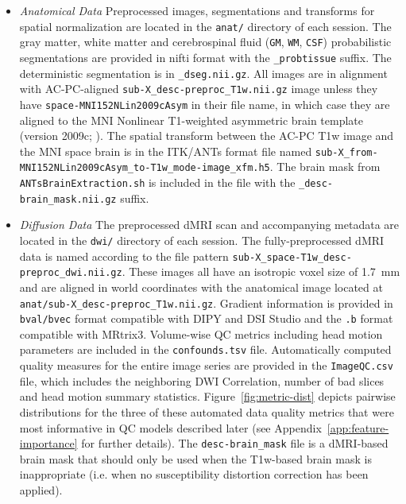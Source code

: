 \documentclass[fleqn,10pt,inline]{wlscirep}
\begin{document}
\begin{itemize}
    \item \emph{Anatomical Data} Preprocessed images, segmentations and transforms for spatial normalization are located in the \texttt{anat/} directory of each session. The gray matter, white matter and  cerebrospinal fluid (\texttt{GM}, \texttt{WM}, \texttt{CSF}) probabilistic segmentations are provided in nifti format with the \texttt{\_probtissue} suffix. The deterministic  segmentation is in \texttt{\_dseg.nii.gz}. All images are in alignment with AC-PC-aligned  \texttt{sub-X\_desc-preproc\_T1w.nii.gz} image unless they have \texttt{space-MNI152NLin2009cAsym} in their file name, in which case they are aligned to the MNI Nonlinear T1-weighted asymmetric brain template (version 2009c; \cite{Fonov2009-ze}).  The spatial transform between the AC-PC T1w image and the MNI space brain is in the ITK/ANTs format file named \texttt{sub-X\_from-MNI152NLin2009cAsym\_to-T1w\_mode-image\_xfm.h5}. The brain mask from \texttt{ANTsBrainExtraction.sh} is included in the file with the \texttt{\_desc-brain\_mask.nii.gz} suffix.

    \item \emph{Diffusion Data} The preprocessed dMRI scan and accompanying metadata are located in the  \texttt{dwi/} directory of each session. The fully-preprocessed dMRI data is named according to the file pattern \texttt{sub-X\_space-T1w\_desc-preproc\_dwi.nii.gz}. These images all have an isotropic voxel size of \qty{1.7}{\mm} and are aligned in world coordinates with the anatomical image located at \texttt{anat/sub-X\_desc-preproc\_T1w.nii.gz}. Gradient information is provided in \texttt{bval/bvec} format compatible with DIPY and DSI Studio and the \texttt{.b} format compatible with MRtrix3. Volume-wise QC metrics including head motion parameters are included in the \texttt{confounds.tsv} file. Automatically computed quality measures for the entire image series are provided in the \texttt{ImageQC.csv} file, which includes the neighboring DWI Correlation, number of bad slices and head motion summary statistics.
    Figure~\ref{fig:metric-dist} depicts pairwise distributions for the three of these automated data quality metrics that were most informative in QC models described later (see Appendix~\ref{app:feature-importance} for further details).
    The \texttt{desc-brain\_mask} file is a dMRI-based brain mask that should only be used when the T1w-based brain mask is inappropriate (i.e. when no susceptibility distortion correction has been applied).
\end{itemize}
\end{document}
